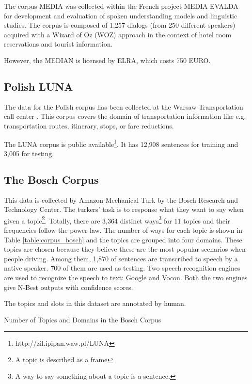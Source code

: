 \documentclass[11pt,letterpaper]{article}
\begin{document}
The corpus MEDIA was collected within the French project MEDIA-EVALDA \cite{Bonneau-Maynard:2006} for development and evaluation of spoken understanding models and linguistic studies. The corpus is composed of 1,257 dialogs (from 250 different speakers) acquired with a Wizard of Oz (WOZ) approach in the context of hotel room reservations and tourist information.

However, the MEDIAN is licensed by ELRA, which costs 750 EURO.

\subsection{Polish LUNA}
The data for the Polish corpus has been collected at the Warsaw Transportation call center \cite{Marasek:2008}. This corpus covers the domain of transportation information like e.g.  transportation routes, itinerary, stops, or fare reductions.

The LUNA corpus is public available\footnote{http://zil.ipipan.waw.pl/LUNA}. It has 12,908 sentences for training and 3,005 for testing.

\subsection{The Bosch Corpus}
This data is collected by Amazon Mechanical Turk by the Bosch Research and Technology Center. %
The turkers’ task is to response what they want to say when given a topic\footnote{A topic is described as a frame}. Totally, there are 3,364 distinct ways\footnote{A way to say something about a topic is a sentence.} for 11 topics and their frequencies follow the power law. The number of ways for each topic is shown in Table \ref{table:corpus_bosch} and the topics are grouped into four domains. These topics are chosen because they believe these are the most popular scenarios when people driving.
Among them, 1,870 of sentences are transcribed to speech by a native speaker. 700 of them are used as testing. Two speech recognition engines are used to recognize the speech to text: Google and Vocon. Both the two engines give N-Best outputs with confidence scores.

The topics and slots in this dataset are annotated by human. 

\begin{table}[!htb] 
\centering 
 
\caption{Number of Topics and Domains in the Bosch Corpus} 
\label{table:corpus_bosch} 
\end{table} 
 
\end{document}
